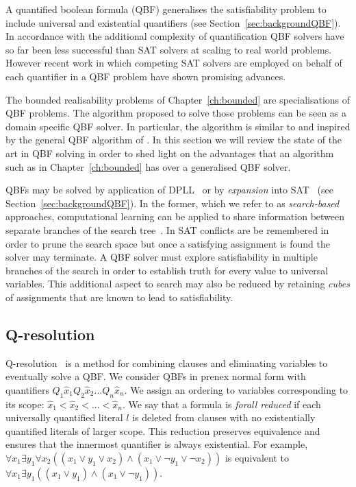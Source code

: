 A quantified boolean formula (QBF) generalises the satisfiability problem to include universal and existential quantifiers (see Section~\ref{sec:backgroundQBF}). In accordance with the additional complexity of quantification QBF solvers have so far been less successful than SAT solvers at scaling to real world problems. However recent work in which competing SAT solvers are employed on behalf of each quantifier in a QBF problem have shown promising advances.

The bounded realisability problems of Chapter~\ref{ch:bounded} are specialisations of QBF problems. The algorithm proposed to solve those problems can be seen as a domain specific QBF solver. In particular, the algorithm is similar to and inspired by the general QBF algorithm of \cite{Janota12}. In this section we will review the state of the art in QBF solving in order to shed light on the advantages that an algorithm such as in Chapter~\ref{ch:bounded} has over a generalised QBF solver.

QBFs may be solved by application of DPLL~\cite{Cadoli98} or by \emph{expansion} into SAT~\cite{Ayari02} (see Section~\ref{sec:backgroundQBF}). In the former, which we refer to as \emph{search-based} approaches, computational learning can be applied to share information between separate branches of the search tree~\cite{Zhang02,Giunchiglia02}. In SAT conflicts are be remembered in order to prune the search space but once a satisfying assignment is found the solver may terminate. A QBF solver must explore satisfiability in multiple branches of the search in order to establish truth for every value to universal variables. This additional aspect to search may also be reduced by retaining \emph{cubes} of assignments that are known to lead to satisfiability.

\subsection{Q-resolution}

Q-resolution~\cite{Buning95} is a method for combining clauses and eliminating variables to eventually solve a QBF. We consider QBFs in prenex normal form with quantifiers $Q_1 \hat{x}_1 Q_2 \hat{x}_2 ... Q_n \hat{x}_n$. We assign an ordering to variables corresponding to its scope: $\hat{x}_1 < \hat{x}_2 < ... < \hat{x}_n$. We say that a formula is \emph{forall reduced} if each universally quantified literal $l$ is deleted from clauses with no existentially quantified literals of larger scope. This reduction preserves equivalence and ensures that the innermost quantifier is always existential. For example, $\forall x_1 \exists y_1 \forall x_2  ((x_1 \lor y_1 \lor x_2) \land (x_1 \lor \lnot y_1 \lor \lnot x_2))$ is equivalent to $\forall x_1 \exists y_1 ((x_1 \lor y_1) \land (x_1 \lor \lnot y_1))$.


